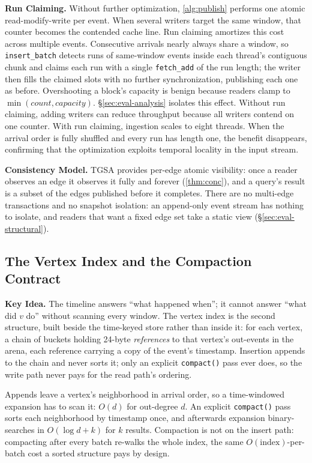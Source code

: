 \documentclass[sigconf,nonacm]{acmart}
\newcommand{\sys}{TGSA\xspace}
\begin{document}
\textbf{Run Claiming.} Without further optimization,
\cref{alg:publish} performs one atomic read-modify-write per event.
When several writers target the same window, that counter becomes the
contended cache line. Run claiming amortizes this cost across multiple
events. Consecutive arrivals nearly
always share a window, so \texttt{insert\_batch} detects runs of
same-window events inside each thread's contiguous chunk and claims
each run with a single \texttt{fetch\_add} of the run length; the writer then fills the claimed slots with no
further synchronization, publishing each one as before. Overshooting a
block's capacity is benign because readers clamp to $\min(count,
capacity)$. \S\ref{sec:eval-analysis} isolates this effect. Without run claiming,
adding writers can reduce throughput because all writers contend on one
counter. With run claiming, ingestion scales to eight threads. When the
arrival order is fully shuffled and every run has length one, the
benefit disappears, confirming that the optimization exploits temporal
locality in the input stream.

\textbf{Consistency Model.} \sys provides per-edge atomic visibility:
once a reader observes an edge it observes it fully and forever
(\cref{thm:conc}), and a query's result is a subset of the edges
published before it completes. There are no multi-edge transactions
and no snapshot isolation: an append-only event stream has nothing to
isolate, and readers that want a fixed edge set take a static view
(\S\ref{sec:eval-structural}).

\subsection{The Vertex Index and the Compaction Contract}\label{sec:storage-vi}
\textbf{Key Idea.} The timeline answers ``what happened when''; it
cannot answer ``what did $v$ do'' without scanning every window. The
vertex index is the second structure, built beside the time-keyed store
rather than inside it: for each vertex, a chain of buckets holding
24-byte \emph{references} to that vertex's out-events in the arena,
each reference carrying a copy of the event's timestamp. Insertion
appends to the chain and never sorts it; only an explicit
\texttt{compact()} pass ever does, so the write path never pays for the
read path's ordering.

Appends leave a vertex's neighborhood in arrival order, so a
time-windowed expansion has to scan it: $O(d)$ for out-degree $d$. An
explicit \texttt{compact()} pass sorts each neighborhood by timestamp
once, and afterwards expansion binary-searches in $O(\log d + k)$ for
$k$ results. Compaction is not on the insert path: compacting after every
batch re-walks the whole index, the same $O(\text{index})$-per-batch
cost a sorted structure pays by design.
\end{document}
